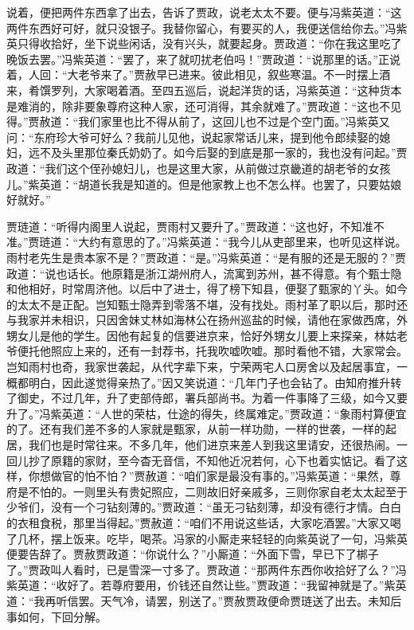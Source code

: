 \begin{parag}
    说着，便把两件东西拿了出去，告诉了贾政，说老太太不要。便与冯紫英道：“这两件东西好可好，就只没银子。我替你留心，有要买的人，我便送信给你去。”冯紫英只得收拾好，坐下说些闲话，没有兴头，就要起身。贾政道：“你在我这里吃了晚饭去罢。”冯紫英道：“罢了，来了就叨扰老伯吗！”贾政道：“说那里的话。”正说着，人回：“大老爷来了。”贾赦早已进来。彼此相见，叙些寒温。不一时摆上酒来，肴馔罗列，大家喝着酒。至四五巡后，说起洋货的话，冯紫英道：“这种货本是难消的，除非要象尊府这种人家，还可消得，其余就难了。”贾政道：“这也不见得。”贾赦道：“我们家里也比不得从前了，这回儿也不过是个空门面。”冯紫英又问：“东府珍大爷可好么？我前儿见他，说起家常话儿来，提到他令郎续娶的媳妇，远不及头里那位秦氏奶奶了。如今后娶的到底是那一家的，我也没有问起。”贾政道：“我们这个侄孙媳妇儿，也是这里大家，从前做过京畿道的胡老爷的女孩儿。”紫英道：“胡道长我是知道的。但是他家教上也不怎么样。也罢了，只要姑娘好就好。”
\end{parag}


\begin{parag}
    贾琏道：“听得内阁里人说起，贾雨村又要升了。”贾政道：“这也好，不知准不准。”贾琏道：“大约有意思的了。”冯紫英道：“我今儿从吏部里来，也听见这样说。雨村老先生是贵本家不是？”贾政道：“是。”冯紫英道：“是有服的还是无服的？”贾政道：“说也话长。他原籍是浙江湖州府人，流寓到苏州，甚不得意。有个甄士隐和他相好，时常周济他。以后中了进士，得了榜下知县，便娶了甄家的丫头。如今的太太不是正配。岂知甄士隐弄到零落不堪，没有找处。雨村革了职以后，那时还与我家并未相识，只因舍妹丈林如海林公在扬州巡盐的时候，请他在家做西席，外甥女儿是他的学生。因他有起复的信要进京来，恰好外甥女儿要上来探亲，林姑老爷便托他照应上来的，还有一封荐书，托我吹嘘吹嘘。那时看他不错，大家常会。岂知雨村也奇，我家世袭起，从代字辈下来，宁荣两宅人口房舍以及起居事宜，一概都明白，因此遂觉得亲热了。”因又笑说道：“几年门子也会钻了。由知府推升转了御史，不过几年，升了吏部侍郎，署兵部尚书。为着一件事降了三级，如今又要升了。”冯紫英道：“人世的荣枯，仕途的得失，终属难定。”贾政道：“象雨村算便宜的了。还有我们差不多的人家就是甄家，从前一样功勋，一样的世袭，一样的起居，我们也是时常往来。不多几年，他们进京来差人到我这里请安，还很热闹。一回儿抄了原籍的家财，至今杳无音信，不知他近况若何，心下也着实惦记。看了这样，你想做官的怕不怕？”贾赦道：“咱们家是最没有事的。”冯紫英道：“果然，尊府是不怕的。一则里头有贵妃照应，二则故旧好亲戚多，三则你家自老太太起至于少爷们，没有一个刁钻刻薄的。”贾政道：“虽无刁钻刻薄，却没有德行才情。白白的衣租食税，那里当得起。”贾赦道：“咱们不用说这些话，大家吃酒罢。”大家又喝了几杯，摆上饭来。吃毕，喝茶。冯家的小厮走来轻轻的向紫英说了一句，冯紫英便要告辞了。贾赦贾政道：“你说什么？”小厮道：“外面下雪，早已下了梆子了。”贾政叫人看时，已是雪深一寸多了。贾政道：“那两件东西你收拾好了么？”冯紫英道：“收好了。若尊府要用，价钱还自然让些。”贾政道：“我留神就是了。”紫英道：“我再听信罢。天气冷，请罢，别送了。”贾赦贾政便命贾琏送了出去。未知后事如何，下回分解。
\end{parag}